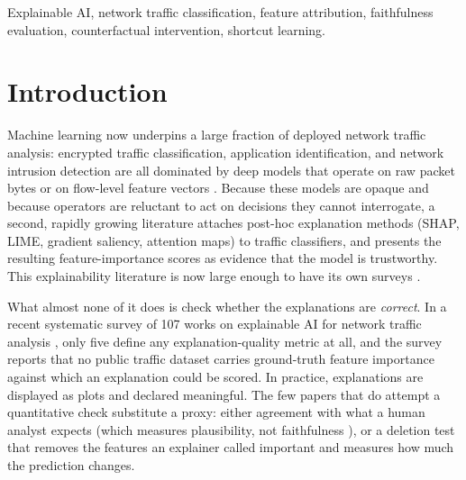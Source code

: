 \documentclass[journal]{IEEEtran}
\begin{document}
\begin{IEEEkeywords}
Explainable AI, network traffic classification, feature attribution, faithfulness evaluation, counterfactual intervention, shortcut learning.
\end{IEEEkeywords}

\section{Introduction}

Machine learning now underpins a large fraction of deployed network
traffic analysis: encrypted traffic classification, application
identification, and network intrusion detection are all dominated by
deep models that operate on raw packet bytes or on flow-level feature
vectors \cite{wang2017endtoend,lotfollahi2020deeppacket,lin2022etbert}.
Because these models are opaque and because operators are reluctant to
act on decisions they cannot interrogate, a second, rapidly growing
literature attaches post-hoc explanation methods (SHAP, LIME, gradient
saliency, attention maps) to traffic classifiers, and presents the
resulting feature-importance scores as evidence that the model is
trustworthy. This explainability literature is now large enough to have
its own surveys \cite{nascita2025survey}.

What almost none of it does is check whether the explanations are
\emph{correct}. In a recent systematic survey of 107 works on
explainable AI for network traffic analysis \cite{nascita2025survey},
only five define any explanation-quality metric at all, and the survey
reports that no public traffic dataset carries ground-truth feature
importance against which an explanation could be scored. In practice,
explanations are displayed as plots and declared meaningful. The few
papers that do attempt a quantitative check substitute a proxy: either
agreement with what a human analyst expects (which measures
plausibility, not faithfulness \cite{jacovi2020towards}), or a deletion
test that removes the features an explainer called important and
measures how much the prediction changes.
\end{document}
